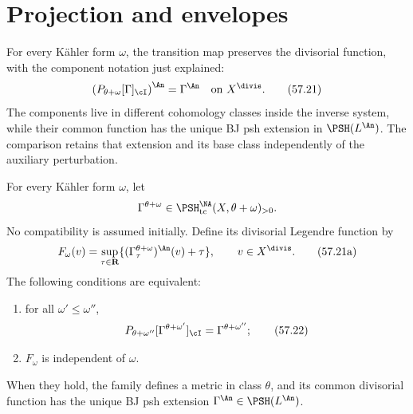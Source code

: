 \section{Projection and envelopes}
\label{sec:comp-projection}

For every K\"ahler form $\omega$, the transition map preserves
the divisorial function, with the component notation just explained:
\[
 \left(P_{\theta+\omega}[\Gamma]_{\cI}\right)^{\An}
                   =\Gamma^{\An}\quad\text{on }X^{\divis}.
\tag{57.21}\label{eq:comp-projection-invariance}
\]
The components live in different cohomology classes inside the inverse
system, while their common function has the unique BJ psh extension in
$\PSH(L^{\An})$. The comparison retains that extension and its base
class independently of the auxiliary perturbation.

\begin{proposition}\label{prop:comp-perturbed-characterization}
For every K\"ahler form $\omega$, let
\[
 \Gamma^{\theta+\omega}\in
       \PSH^{\NA}_{\mathrm{tc}}(X,\theta+\omega)_{>0}.
\]
No compatibility is assumed initially. Define its divisorial Legendre
function by
\[
 F_\omega(v)=\sup_{\tau\in\mathbf R}
       \{(\Gamma_\tau^{\theta+\omega})^{\An}(v)+\tau\},
                  \qquad v\in X^{\divis}.
\tag{57.21a}\label{eq:comp-component-function}
\]
The following conditions are equivalent:
\begin{enumerate}
\item for all $\omega'\leq\omega''$,
\[
 P_{\theta+\omega''}
       [\Gamma^{\theta+\omega'}]_{\cI}
       =\Gamma^{\theta+\omega''};
\tag{57.22}\label{eq:comp-cocycle}
\]
\item $F_\omega$ is independent of $\omega$.
\end{enumerate}
When they hold, the family defines a metric in class $\theta$, and
its common divisorial function has the unique BJ psh extension
$\Gamma^{\An}\in\PSH(L^{\An})$.
\end{proposition}

